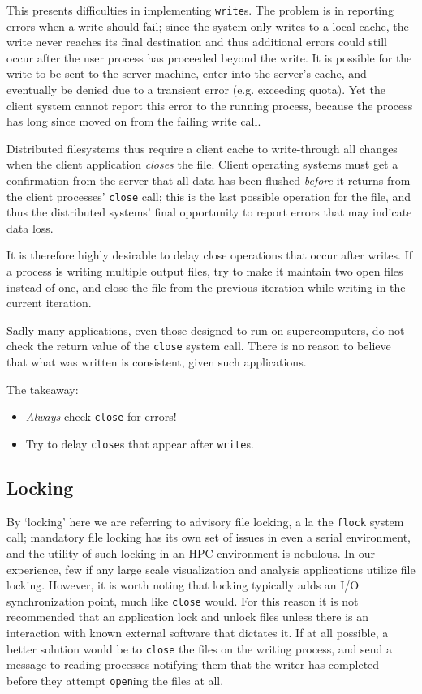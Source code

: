 This presents difficulties in implementing \verb!write!s.  The problem
is in reporting errors when a write should fail; since the system only
writes to a local cache, the write never reaches its final destination
and thus additional errors could still occur after the user process has
proceeded beyond the write.  It is possible for the write to be sent to
the server machine, enter into the server's cache, and eventually be
denied due to a transient error (e.g. exceeding quota).  Yet the client
system cannot report this error to the running process, because the
process has long since moved on from the failing write call.

Distributed filesystems thus require a client cache to write-through
all changes when the client application \emph{closes} the file.  Client
operating systems must get a confirmation from the server that all data
has been flushed
\emph{before} it returns from the client processes' \verb!close!
call; this is the last possible operation for the file, and thus the
distributed systems' final opportunity to report errors that may
indicate data loss.

It is therefore highly desirable to delay close operations that occur
after writes.  If a process is writing multiple output files, try to
make it maintain two open files instead of one, and close the file from
the previous iteration while writing in the current iteration.

Sadly many applications, even those designed to run on supercomputers,
do not check the return value of the \verb!close! system call.  There
is no reason to believe that what was written is consistent, given
such applications.

The takeaway:

\begin{itemize}
  \item \emph{Always} check \verb!close! for errors!
  \item Try to delay \verb!close!s that appear after \verb!write!s.
\end{itemize}

\subsection{Locking}

By `locking' here we are referring to advisory file locking, a la
the \verb!flock! system call; mandatory file locking has its own
set of issues in even a serial environment, and the utility of such
locking in an HPC environment is nebulous.  In our experience, few
if any large scale visualization and analysis applications utilize
file locking.  However, it is worth noting that locking typically
adds an I/O synchronization point, much like \verb!close! would.  For
this reason it is not recommended that an application lock and unlock
files unless there is an interaction with known external software
that dictates it.  If at all possible, a better solution would be to
\verb!close! the files on the writing process, and send a message to
reading processes notifying them that the writer has completed---before
they attempt \verb!open!ing the files at all.

